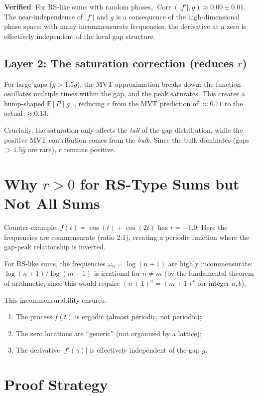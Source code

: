 \documentclass[11pt]{article}
\DeclareMathOperator{\Corr}{Corr}
\begin{document}
\textbf{Verified}: For RS-like sums with random phases, $\Corr(|f'|, g) \approx 0.00 \pm 0.01$.
The near-independence of $|f'|$ and $g$ is a consequence of the high-dimensional phase space:
with many incommensurate frequencies, the derivative at a zero is effectively independent
of the local gap structure.

\subsection{Layer 2: The saturation correction (reduces $r$)}

For large gaps ($g > 1.5\bar{g}$), the MVT approximation breaks down:
the function oscillates multiple times within the gap, and the peak saturates.
This creates a hump-shaped $\mathbb{E}[P \mid g]$, reducing $r$ from the MVT prediction
of $\approx 0.71$ to the actual $\approx 0.13$.

Crucially, the saturation only affects the \emph{tail} of the gap distribution,
while the positive MVT contribution comes from the \emph{bulk}.
Since the bulk dominates (gaps $> 1.5\bar{g}$ are rare), $r$ remains positive.

\section{Why $r > 0$ for RS-Type Sums but Not All Sums}

Counter-example: $f(t) = \cos(t) + \cos(2t)$ has $r = -1.0$.
Here the frequencies are commensurate (ratio 2:1), creating a periodic function
where the gap-peak relationship is inverted.

For RS-like sums, the frequencies $\omega_n = \log(n+1)$ are highly incommensurate:
$\log(n+1)/\log(m+1)$ is irrational for $n \neq m$ (by the fundamental theorem of arithmetic,
since this would require $(n+1)^a = (m+1)^b$ for integer $a, b$).

This incommensurability ensures:
\begin{enumerate}
\item The process $f(t)$ is ergodic (almost periodic, not periodic);
\item The zero locations are ``generic'' (not organized by a lattice);
\item The derivative $|f'(\gamma)|$ is effectively independent of the gap $g$.
\end{enumerate}

\section{Proof Strategy}
\end{document}
